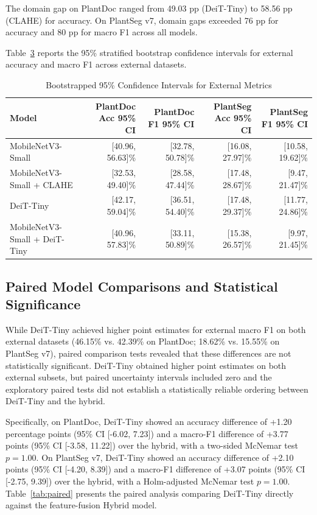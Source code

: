 \documentclass[10pt,journal,compsoc]{IEEEtran}
\begin{document}
\begin{table}[t]
\begin{table}[t]
The domain gap on PlantDoc ranged from 49.03 pp (DeiT-Tiny) to 58.56 pp (CLAHE) for accuracy. On PlantSeg v7, domain gaps exceeded 76 pp for accuracy and 80 pp for macro F1 across all models.

Table~\ref{tab:cis} reports the 95\% stratified bootstrap confidence intervals for external accuracy and macro F1 across external datasets.

\begin{table}[t]
\caption{Bootstrapped 95\% Confidence Intervals for External Metrics}
\label{tab:cis}
\centering
\begin{tabular}{lrrrr}
\toprule
\textbf{Model} & \textbf{PlantDoc Acc 95\% CI} & \textbf{PlantDoc F1 95\% CI} & \textbf{PlantSeg Acc 95\% CI} & \textbf{PlantSeg F1 95\% CI} \\
\midrule
MobileNetV3-Small & [40.96, 56.63]\% & [32.78, 50.78]\% & [16.08, 27.97]\% & [10.58, 19.62]\% \\
MobileNetV3-Small + CLAHE & [32.53, 49.40]\% & [28.58, 47.44]\% & [17.48, 28.67]\% & [9.47, 21.47]\% \\
DeiT-Tiny & [42.17, 59.04]\% & [36.51, 54.40]\% & [17.48, 29.37]\% & [11.77, 24.86]\% \\
MobileNetV3-Small + DeiT-Tiny & [40.96, 57.83]\% & [33.11, 50.89]\% & [15.38, 26.57]\% & [9.97, 21.45]\% \\
\bottomrule
\end{tabular}
\end{table}

\subsection{Paired Model Comparisons and Statistical Significance}
While DeiT-Tiny achieved higher point estimates for external macro F1 on both external datasets (46.15\% vs. 42.39\% on PlantDoc; 18.62\% vs. 15.55\% on PlantSeg v7), paired comparison tests revealed that these differences are not statistically significant. DeiT-Tiny obtained higher point estimates on both external subsets, but paired uncertainty intervals included zero and the exploratory paired tests did not establish a statistically reliable ordering between DeiT-Tiny and the hybrid.

Specifically, on PlantDoc, DeiT-Tiny showed an accuracy difference of +1.20 percentage points (95\% CI [-6.02, 7.23]) and a macro-F1 difference of +3.77 points (95\% CI [-3.58, 11.22]) over the hybrid, with a two-sided McNemar test $p = 1.00$. On PlantSeg v7, DeiT-Tiny showed an accuracy difference of +2.10 points (95\% CI [-4.20, 8.39]) and a macro-F1 difference of +3.07 points (95\% CI [-2.75, 9.39]) over the hybrid, with a Holm-adjusted McNemar test $p = 1.00$. Table~\ref{tab:paired} presents the paired analysis comparing DeiT-Tiny directly against the feature-fusion Hybrid model.


\end{table}
\end{table}
\end{document}
